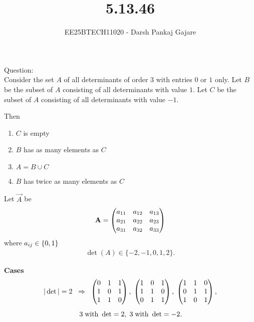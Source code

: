 \documentclass{beamer}
\let\solution\relax
\numberwithin{equation}{section}
\begin{document}
\title{5.13.46}
\author{EE25BTECH11020 - Darsh Pankaj Gajare}
{\let\newpage\relax\maketitle}

Question:\\Consider the set $A$ of all determinants of order $3$ with entries $0$ or $1$ only. Let $B$ be the subset of $A$ consisting of all determinants with value $1$. Let $C$ be the subset of $A$ consisting of all determinants with value $-1$. 

Then

\begin{multicols}{2}
	\begin{enumerate}[label=(\Alph*)]
    \item $C$ is empty
    \item $B$ has as many elements as $C$
    \item $A = B \cup C$
    \item $B$ has twice as many elements as $C$
\end{enumerate}
\end{multicols}
\solution

Let $\vec{A}$ be
\begin{align}
	\mathbf{A}=\begin{pmatrix}a_{11}&a_{12}&a_{13}\\a_{21}&a_{22}&a_{23}\\a_{31}&a_{32}&a_{33}\end{pmatrix}
\end{align}
where $a_{ij}\in \left\{0,1\right\}$ 
\begin{align}
\det(A)\in\{-2,-1,0,1,2\}.
\end{align}


\textbf{ Cases}
\begin{align}
|\det|=2 &\;\;\Rightarrow\;\;
\begin{pmatrix}0&1&1\\1&0&1\\1&1&0\end{pmatrix},\;
\begin{pmatrix}1&0&1\\1&1&0\\0&1&1\end{pmatrix},\;
\begin{pmatrix}1&1&0\\0&1&1\\1&0&1\end{pmatrix}, \\[1ex]
&\quad 3 \;\text{with } \det=2,\;
3 \;\text{with } \det=-2.
\end{align}
\end{document}
